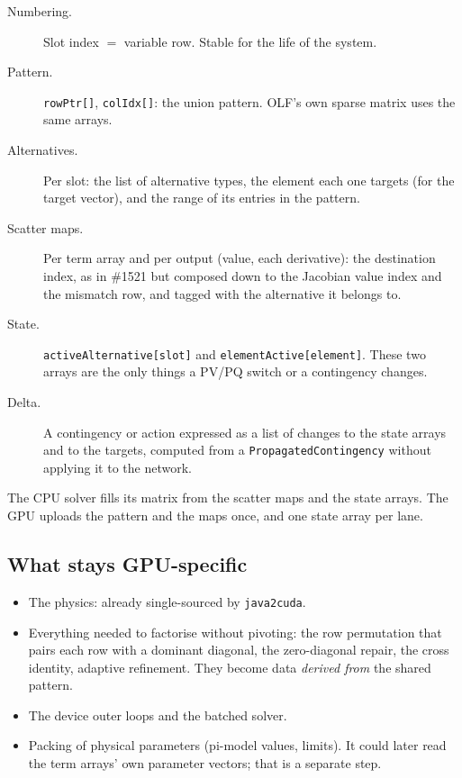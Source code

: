 \documentclass[11pt,a4paper]{article}
\newcommand{\code}[1]{\texttt{\small #1}}
\begin{document}
\begin{description}
\item[Numbering.] Slot index $=$ variable row. Stable for the life of the system.
\item[Pattern.] \code{rowPtr[]}, \code{colIdx[]}: the union pattern. OLF's own sparse
      matrix uses the same arrays.
\item[Alternatives.] Per slot: the list of alternative types, the element each one
      targets (for the target vector), and the range of its entries in the pattern.
\item[Scatter maps.] Per term array and per output (value, each derivative): the
      destination index, as in \#1521 but composed down to the Jacobian value index and
      the mismatch row, and tagged with the alternative it belongs to.
\item[State.] \code{activeAlternative[slot]} and \code{elementActive[element]}. These
      two arrays are the only things a PV/PQ switch or a contingency changes.
\item[Delta.] A contingency or action expressed as a list of changes to the state arrays
      and to the targets, computed from a \code{PropagatedContingency} without applying
      it to the network.
\end{description}

The CPU solver fills its matrix from the scatter maps and the state arrays. The GPU
uploads the pattern and the maps once, and one state array per lane.

\subsection{What stays GPU-specific}

\begin{itemize}
\item The physics: already single-sourced by \code{java2cuda}.
\item Everything needed to factorise without pivoting: the row permutation that pairs
      each row with a dominant diagonal, the zero-diagonal repair, the cross identity,
      adaptive refinement. They become data \emph{derived from} the shared pattern.
\item The device outer loops and the batched solver.
\item Packing of physical parameters (pi-model values, limits). It could later read the
      term arrays' own parameter vectors; that is a separate step.
\end{itemize}
\end{document}
